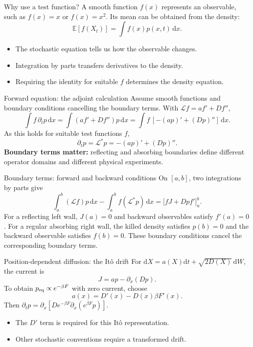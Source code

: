 \documentclass[aspectratio=169,10pt]{beamer}
\newcommand{\dd}{\mathrm{d}}
\begin{document}
\begin{frame}{Why use a test function?}
A smooth function $f(x)$ represents an observable, such as $f(x)=x$ or $f(x)=x^2$. Its mean can be obtained from the density:
\[\mathbb E[f(X_t)]=\int f(x)p(x,t)\,\dd x.\]
\begin{itemize}
\item The stochastic equation tells us how the observable changes.
\item Integration by parts transfers derivatives to the density.
\item Requiring the identity for suitable $f$ determines the density equation.
\end{itemize}
\end{frame}

\begin{frame}{Forward equation: the adjoint calculation}
Assume smooth functions and boundary conditions cancelling the boundary terms. With $\mathcal L f=af'+Df''$,
\[
\int f\,\partial_t p\,\dd x
=\int (af'+Df'')p\,\dd x
=\int f\,[-(ap)'+(Dp)'']\,\dd x.
\]
As this holds for suitable test functions $f$,
\[\partial_t p=\mathcal L^*p=-(ap)'+(Dp)''.\]
\textbf{Boundary terms matter:} reflecting and absorbing boundaries define different operator domains and different physical experiments.
\end{frame}

\begin{frame}{Boundary terms: forward and backward conditions}
On $[a,b]$, two integrations by parts give
\[\int_a^b (\mathcal Lf)p\,\dd x-\int_a^b f(\mathcal L^*p)\,\dd x
=\big[fJ+Dp f'\big]_{a}^{b}.\]
For a reflecting left wall, $J(a)=0$ and backward observables satisfy $f'(a)=0$. For a regular absorbing right wall, the killed density satisfies $p(b)=0$ and the backward observable satisfies $f(b)=0$.
\vspace{0.2cm}
These boundary conditions cancel the corresponding boundary terms.
\end{frame}

\begin{frame}{Position-dependent diffusion: the It\^o drift}
For $\dd X=a(X)\dd t+\sqrt{2D(X)}\,\dd W$, the current is
\[J=a p-\partial_x(Dp).\]
To obtain $p_{\rm eq}\propto e^{-\beta F}$ with zero current, choose
\[\boxed{a(x)=D'(x)-D(x)\beta F'(x).}\]
Then $\partial_t p=\partial_x[D e^{-\beta F}\partial_x(e^{\beta F}p)]$.
\begin{itemize}
\item The $D'$ term is required for this It\^o representation.
\item Other stochastic conventions require a transformed drift.
\end{itemize}
\end{frame}
\end{document}
